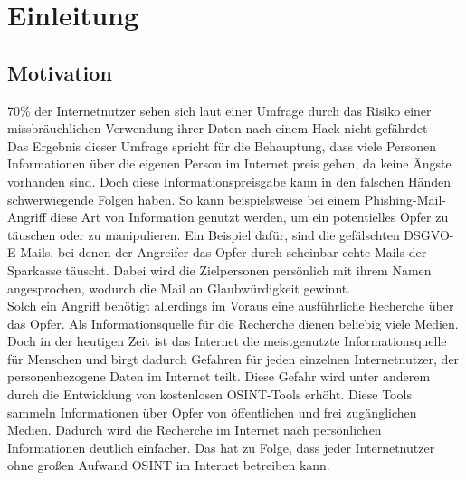 \chapter{Einleitung}
\label{cha:einleitung}

\section{Motivation}
70\% der Internetnutzer sehen sich laut einer Umfrage durch das Risiko einer missbräuchlichen Verwendung ihrer Daten nach einem Hack nicht gefährdet \cite{AngstDatendiebstahl}\\
Das Ergebnis dieser Umfrage spricht für die Behauptung, dass viele Personen Informationen über die eigenen Person im Internet preis geben, da keine Ängste vorhanden sind. Doch diese Informationspreisgabe kann in den falschen Händen schwerwiegende Folgen haben. So kann beispielsweise bei einem Phishing-Mail-Angriff diese Art von Information genutzt werden, um ein potentielles Opfer zu täuschen oder zu manipulieren. 
Ein Beispiel dafür, sind die gefälschten DSGVO-E-Mails, bei denen der Angreifer das Opfer durch scheinbar echte Mails der Sparkasse täuscht. Dabei wird die Zielpersonen persönlich mit ihrem Namen angesprochen, wodurch die Mail an Glaubwürdigkeit gewinnt. \cite{VerbraucherzentraleNW}
\\
Solch ein Angriff benötigt allerdings im Voraus eine ausführliche Recherche über das Opfer. Als Informationsquelle für die Recherche dienen beliebig viele Medien. Doch in der heutigen Zeit ist das Internet die meistgenutzte Informationsquelle für Menschen und birgt dadurch Gefahren für jeden einzelnen Internetnutzer, der personenbezogene Daten im Internet teilt. \cite{Inforamtionsquellen} Diese Gefahr wird unter anderem durch die Entwicklung von kostenlosen OSINT-Tools erhöht. Diese Tools sammeln Informationen über Opfer von öffentlichen und frei zugänglichen Medien. Dadurch wird die Recherche im Internet nach persönlichen Informationen deutlich einfacher. Das hat zu Folge, dass jeder Internetnutzer ohne großen Aufwand OSINT im Internet betreiben kann.
